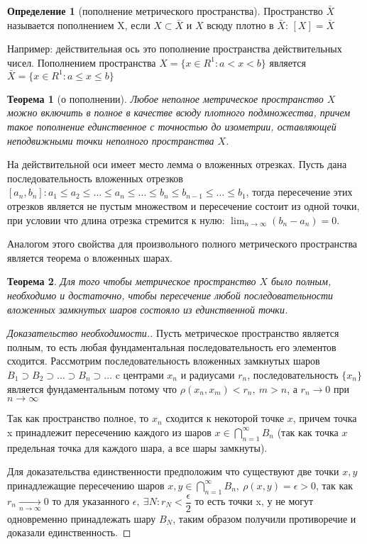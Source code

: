 \documentclass[14pt,a4paper]{extarticle}
\newtheorem{theorem}{Теорема}[section]
\theoremstyle{definition}
\newtheorem{definition}{Определение}[section]
\theoremstyle{remark}
\renewcommand{\[}{\begin{dmath*}[compact]}
\renewcommand{\]}{\end{dmath*}}
\newcommand{\ds}{\displaystyle}
\newcommand{\sep}{ , \ \allowbreak }
\newcommand\f[2]{\dfrac{#1}{#2}}
\begin{document}
\begin{definition}[пополнение метрического пространства]
  Пространство $\bar X$ называется пополнением X, если $X \subset \bar{X}$ и $X$
  всюду плотно в $\bar X$: $[X] = \bar X$
\end{definition}

Например: действительная ось это пополнение пространства действительных чисел.
Пополнением пространства $X = \{x \in R^1: a < x < b\}$ является
$\bar{X} = \{x \in R^1: a \leq x \leq b\}$

\begin{theorem}[о пополнении]
\label{th:о пополнении}
  Любое неполное метрическое пространство $X$ можно
  включить в полное в качестве всюду плотного подмножества,
  причем такое пополнение единственное с точностью до изометрии,
  оставляющей неподвижными точки неполного пространства $X$.
\end{theorem}

На действительной оси имеет место лемма о вложенных отрезках. Пусть дана
последовательность вложенных отрезков $[a_n, b_n]: a_1 \leq a_2 \leq \dots \leq
a_n \leq \dots \leq b_n \leq b_{n-1} \leq \dots \leq b_1 $, тогда пересечение
этих отрезков является не пустым множеством и пересечение состоит из одной
точки, при условии что длина отрезка стремится к нулю:
$\ds \lim_{n \to \infty}(b_n - a_n) = 0$.

Аналогом этого свойства для произвольного полного метрического пространства
является теорема о вложенных шарах.

\begin{theorem}
  Для того чтобы метрическое пространство $X$ было полным,
  необходимо и достаточно, чтобы пересечение любой последовательности вложенных
  замкнутых шаров состояло из единственной точки.
\end{theorem}

\begin{proof}[Доказательство необходимости.]
  Пусть метрическое пространство является полным, то есть любая фундаментальная
  последовательность его элементов сходится. Рассмотрим последовательность
  вложенных замкнутых шаров
  $B_{1} \supset B_{2} \supset \dots \supset B_{n} \supset \dots$
  c центрами $x_{n}$ и радиусами $r_{n}$, последовательность $\{x_n\}$ является
  фундаментальным потому что $\rho(x_n, x_m) < r_n\sep m > n$,
  а $r_n \to 0$ при $n \to \infty$

  Так как пространство полное, то $x_{n}$ сходится к некоторой точке $x$,
  причем точка x принадлежит пересечению каждого из шаров
  $x \in \bigcap _{n = 1}^{\infty} B_{n}$ (так как точка $x$
  предельная точка для каждого шара, а все шары замкнуты).

  Для доказательства единственности предположим что существуют две точки $x, y$
  принадлежащие пересечению шаров
  $x, y \in \bigcap _{n = 1}^{\infty} B_{n} \sep \rho(x, y) = \epsilon > 0$,
  так как $r_n \underset{n \to \infty}{\to} 0$ то для указанного
  $\epsilon \sep \exists N: r_N < \f\epsilon2$
  то есть точки x, у не могут одновременно принадлежать шару $B_N$, таким образом
  получили противоречие и доказали единственность.
\end{proof}
\end{document}
